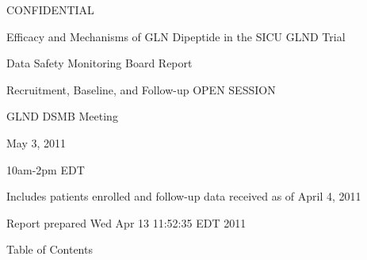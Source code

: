 \documentclass[dvips, 10pt]{article}
\begin{document}
\vspace*{1in}
\begin{center}
{\Huge{CONFIDENTIAL}}
\end{center}
\vspace*{0.5in}
\begin{center}
{\Huge{Efficacy and Mechanisms of GLN Dipeptide in the SICU GLND Trial}}
\end{center}
\vspace*{0.5in}
\begin{center}
{\Huge{Data Safety Monitoring Board Report}}
\end{center}
\vspace*{0.25in}
\begin{center}
{\Huge{
Recruitment, Baseline, and Follow-up  OPEN SESSION
}}
\end{center}
\vspace*{1in}
\begin{center}
{\Huge{GLND DSMB Meeting}}
\end{center}
\begin{center}
{\Huge{
May 3, 2011
}}
\end{center}
\begin{center}
{\Huge{10am-2pm EDT}}
\end{center}
\vspace*{1in}
\begin{center}
\noindent
{\Large{Includes patients enrolled and follow-up data received as of April 4, 2011}}
\end{center}
\vspace*{0.5in}
\begin{center}
{\Large{Report prepared  Wed Apr 13 11:52:35 EDT 2011 }}
\end{center}
\clearpage
\vspace*{1in}
\begin{center}
{\Huge{Table of Contents}}
\end{center}
\listoftables
\listoffigures
\clearpage
\end{document}
